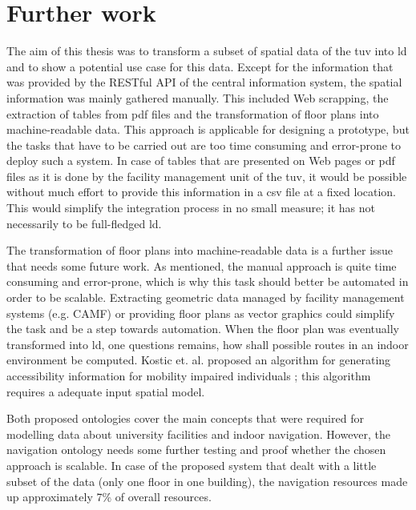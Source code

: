 \documentclass[draft,final]{vutinfth} %
\begin{document}
\section{Further work}
\label{dicussion-chapter-future-work}
The aim of this thesis was to transform a subset of spatial data of the \gls{tuv} into \gls{ld} and to show a potential use case for this data.  Except for the information that was provided by the RESTful API of the central information system, the spatial information was mainly gathered manually. This included Web scrapping, the extraction of tables from \gls{pdf} files and the transformation of floor plans into machine-readable data. This approach is applicable for designing a prototype, but the tasks that have to be carried out are too time consuming and error-prone to deploy such a system. In case of tables that are presented on Web pages or \gls{pdf} files as it is done by the facility management unit of the \gls{tuv}, it would be possible without much effort to provide this information in a \gls{csv} file at a fixed location. This would simplify the integration process in no small measure; it has not necessarily to be full-fledged \gls{ld}. 

The transformation of floor plans into machine-readable data is a further issue that needs some future work. As mentioned, the manual approach is quite time consuming and error-prone, which is why this task should better be automated in order to be scalable. Extracting geometric data managed by facility management systems (e.g. CAMF) or providing floor plans as vector graphics could simplify the task and be a step towards automation. When the floor plan was eventually transformed into \gls{ld}, one questions remains, how shall possible routes in an indoor environment be computed. Kostic et. al. proposed an algorithm for generating accessibility information for mobility impaired individuals \cite{kostic_automated_2015-1}; this algorithm requires a adequate input spatial model.

Both proposed ontologies cover the main concepts that were required for modelling data about university facilities and indoor navigation. However, the navigation ontology needs some further testing and proof whether the chosen approach is scalable. In case of the proposed system that dealt with a little subset of the data (only one floor in one building), the navigation resources made up approximately 7\% of overall resources.  
\end{document}
